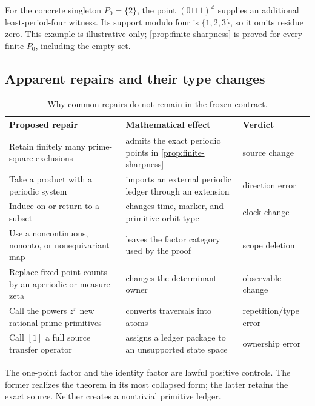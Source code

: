 For the concrete singleton \(P_0=\{2\}\), the point
\((0111)^{\mathbb Z}\) supplies an additional least-period-four witness.  Its
support modulo four is \(\{1,2,3\}\), so it omits residue zero.  This example
is illustrative only; \cref{prop:finite-sharpness} is proved for every finite
\(P_0\), including the empty set.



\subsection{Apparent repairs and their type changes}

\begin{table}[t]
\centering
\small
\caption{Why common repairs do not remain in the frozen contract.}
\label{tab:repairs}
\begin{tabularx}{\textwidth}{@{}>{\raggedright\arraybackslash}X
  >{\raggedright\arraybackslash}Xl@{}}
\toprule
Proposed repair & Mathematical effect & Verdict \\
\midrule
Retain finitely many prime-square exclusions
  & admits the exact periodic points in \cref{prop:finite-sharpness}
  & source change \\
Take a product with a periodic system
  & imports an external periodic ledger through an extension
  & direction error \\
Induce on or return to a subset
  & changes time, marker, and primitive orbit type
  & clock change \\
Use a noncontinuous, nononto, or nonequivariant map
  & leaves the factor category used by the proof
  & scope deletion \\
Replace fixed-point counts by an aperiodic or measure zeta
  & changes the determinant owner
  & observable change \\
Call the powers \(z^r\) new rational-prime primitives
  & converts traversals into atoms
  & repetition/type error \\
Call \([1]\) a full source transfer operator
  & assigns a ledger package to an unsupported state space
  & ownership error \\
\bottomrule
\end{tabularx}
\end{table}

The one-point factor and the identity factor are lawful positive controls.
The former realizes the theorem in its most collapsed form; the latter
retains the exact source.  Neither creates a nontrivial primitive ledger.

